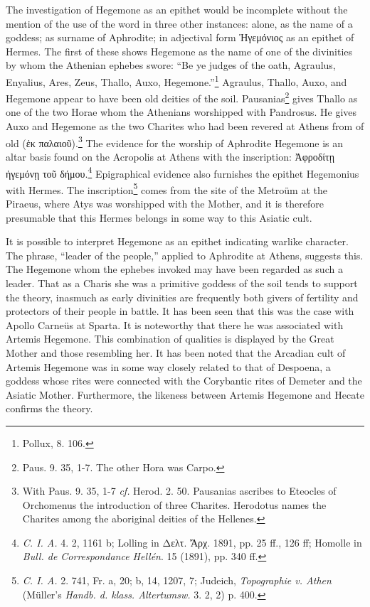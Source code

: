 \documentclass[a4paper, 12pt, oneside]{article}
\begin{document}
The investigation of Hegemone as an epithet would be incomplete without the mention of the use of the word in three other instances: alone, as the name of a goddess; as surname of Aphrodite; in adjectival form Ἡγεμόνιος as an epithet of Hermes. The first of these shows Hegemone as the name of one of the divinities by whom the Athenian ephebes swore: ``Be ye judges of the oath, Agraulus, Enyalius, Ares, Zeus, Thallo, Auxo, Hegemone.''\footnote{Pollux, 8. 106.} Agraulus, Thallo, Auxo, and Hegemone appear to have been old deities of the soil. Pausanias\footnote{Paus. 9. 35, 1-7. The other Hora was Carpo.} gives Thallo as one of the two Horae whom the Athenians worshipped with Pandrosus. He gives Auxo and Hegemone as the two Charites who had been revered at Athens from of old (ἐκ παλαιοῦ).\footnote{With Paus. 9. 35, 1-7 \emph{cf.} Herod. 2. 50. Pausanias ascribes to Eteocles of Orchomenus the introduction of three Charites. Herodotus names the Charites among the aboriginal deities of the Hellenes.} The evidence for the worship of Aphrodite Hegemone is an altar basis found on the Acropolis at Athens with the inscription: Ἀφροδίτῃ ἡγεμόνῃ τοῦ δήμου.\footnote{\emph{C. I. A.} 4. 2, 1161 b; Lolling in Δελτ. Ἄρχ. 1891, pp. 25 ff., 126 ff; Homolle in \emph{Bull. de Correspondance Hellén}. 15 (1891), pp. 340 ff.} Epigraphical evidence also furnishes the epithet Hegemonius with Hermes. The inscription\footnote{\emph{C. I. A.} 2. 741, Fr. a, 20; b, 14, 1207, 7; Judeich, \emph{Topographie v. Athen} (Müller's \emph{Handb. d. klass. Altertumsw.} 3. 2, 2) p. 400.} comes from the site of the Metroüm at the Piraeus, where Atys was worshipped with the Mother, and it is therefore presumable that this Hermes belongs in some way to this Asiatic cult.

It is possible to interpret Hegemone as an epithet indicating warlike character. The phrase, ``leader of the people,'' applied to Aphrodite at Athens, suggests this. The Hegemone whom the ephebes invoked may have been regarded as such a leader. That as a Charis she was a primitive goddess of the soil tends to support the theory, inasmuch as early divinities are frequently both givers of fertility and protectors of their people in battle. It has been seen that this was the case with Apollo Carneüs at Sparta. It is noteworthy that there he was associated with Artemis Hegemone. This combination of qualities is displayed by the Great Mother and those resembling her. It has been noted that the Arcadian cult of Artemis Hegemone was in some way closely related to that of Despoena, a goddess whose rites were connected with the Corybantic rites of Demeter and the Asiatic Mother. Furthermore, the likeness between Artemis Hegemone and Hecate confirms the theory.
\end{document}
